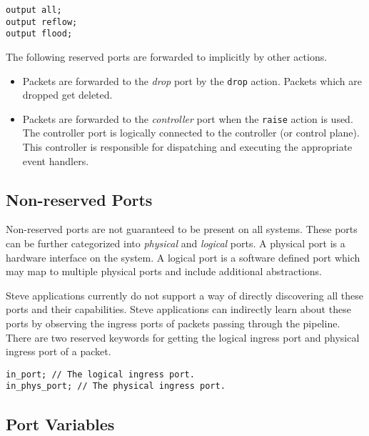 \begin{codepage}
\begin{lstlisting}
output all;
output reflow;
output flood;
\end{lstlisting}
\end{codepage}

The following reserved ports are forwarded to implicitly by other actions.

\begin{itemize}
\item Packets are forwarded to the \textit{drop} port by the \texttt{drop} action.
Packets which are dropped get deleted.

\item Packets are forwarded to the \textit{controller} port when the 
\texttt{raise} action is used.
The controller port is logically connected to the controller (or control plane).
This controller is responsible for dispatching and executing the 
appropriate event handlers.
\end{itemize}

\subsection{Non-reserved Ports} \label{tut:regular_ports}

Non-reserved ports are not guaranteed to be present on all systems.
These ports can be further categorized into \textit{physical} and
\textit{logical} ports. A physical port is a hardware interface on the system. A
logical port is a software defined port which may map to multiple physical ports
and include additional abstractions.

Steve applications currently do not support a way of directly discovering all
these ports and their capabilities. Steve applications can indirectly learn
about these ports by observing the ingress ports of packets passing
through the pipeline.
There are two reserved keywords for getting the logical ingress port and physical ingress port of a packet.

\begin{codepage}
\begin{lstlisting}
in_port; // The logical ingress port.
in_phys_port; // The physical ingress port.
\end{lstlisting}
\end{codepage}

\subsection{Port Variables} \label{tut:declared_ports}

